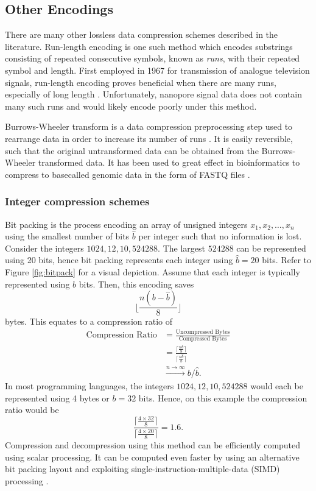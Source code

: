 \subsection{Other Encodings}
\label{sec:data-other}

There are many other lossless data compression schemes described in the literature. Run-length encoding is one such method which encodes substrings consisting of repeated consecutive symbols, known as \textit{runs}, with their repeated symbol and length. First employed in 1967 for transmission of analogue television signals, run-length encoding proves beneficial when there are many runs, especially of long length \cite{rle}. Unfortunately, nanopore signal data does not contain many such runs and would likely encode poorly under this method.

Burrows-Wheeler transform is a data compression preprocessing step used to rearrange data in order to increase its number of runs \cite{bwt}. It is easily reversible, such that the original untransformed data can be obtained from the Burrows-Wheeler transformed data. It has been used to great effect in bioinformatics to compress to basecalled genomic data in the form of FASTQ files \cite{bwt-genomic}.

\subsubsection{Integer compression schemes}
\label{sec:integer-comp}

Bit packing is the process encoding an array of unsigned integers $x_1, x_2, \dots, x_n$
using the smallest number of bits $\hat b$ per integer such that no information is lost.
Consider the integers $1024,12,10,\num{524288}$. The largest $\num{524288}$ can be represented using 20 bits, hence bit packing represents each integer using $\hat b = 20$ bits. Refer to Figure \ref{fig:bitpack} for a visual depiction.
Assume that each integer is typically represented using $b$ bits.
Then, this encoding saves
\[\lfloor \frac{n(b-\hat b)}{8}\rfloor\]
bytes. This equates to a compression ratio of
\begin{align*}
	\text{Compression Ratio} &= \frac{\text{Uncompressed Bytes}}{\text{Compressed Bytes}}\\
	&= \frac{\lceil \frac{nb}{8}\rceil}{\lceil \frac{n\hat b}{8}\rceil}\\
	&\stackrel{n\to\infty}{\longrightarrow}b/\hat b.
\end{align*}
In most programming languages, the integers $1024,12,10,\num{524288}$ would each be represented using 4 bytes or $b=32$ bits.
Hence, on this example the compression ratio would be
\[\frac{\lceil \frac{4 \times 32}{8}\rceil}{\lceil \frac{4 \times 20}{8}\rceil} = 1.6.\]
Compression and decompression using this method can be efficiently computed using scalar processing.
It can be computed even faster by using an alternative bit packing layout and exploiting single-instruction-multiple-data (SIMD) processing  \cite{lemire-simd}.

